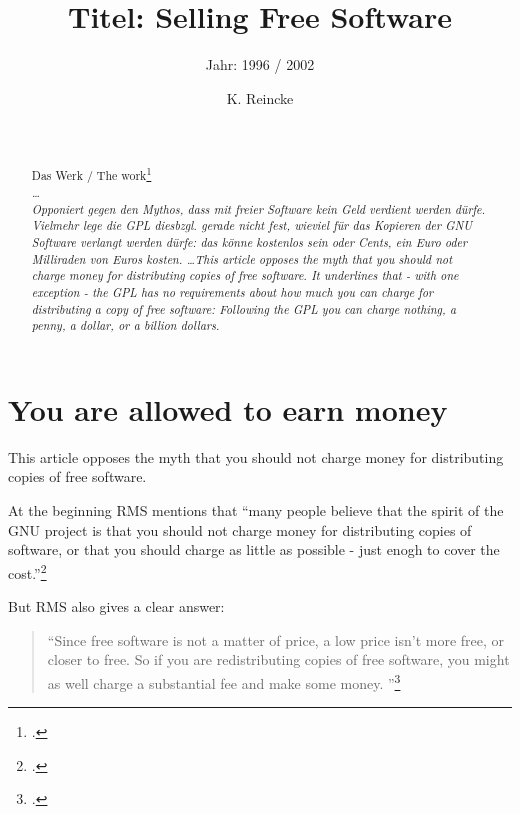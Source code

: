 \documentclass[DIV=calc,BCOR=5mm,11pt,headings=small,oneside,abstract=true, toc=bib]{scrartcl}
\begin{document}

\titlehead{Literaturexzerpt}
\subject{Autor(en): Stallman / Stallman1996b}
\title{Titel: Selling Free Software}
\subtitle{Jahr: 1996 / 2002 }
\author{K. Reincke}

\maketitle

\begin{abstract}
\noindent
\cite[(in:)][]{StaGay2002a} \\
\noindent
\cite[(ist:)][]{Stallman1996b} \\
Das Werk / The work\footcite[][]{Stallman1996b} \\
\noindent \itshape
\ldots  
\\ Opponiert gegen den Mythos, dass mit freier Software kein Geld verdient
werden dürfe. Vielmehr lege die GPL diesbzgl. gerade nicht fest, wieviel für das
Kopieren der GNU Software verlangt werden dürfe: das könne kostenlos sein oder
Cents, ein Euro oder Milliraden von Euros kosten.
\noindent
\ldots This article opposes the myth that you should not charge money for
distributing copies of free software. It underlines that - with one exception -
the GPL has no requirements about how much you can charge for distributing a
copy of free software: Following the GPL you can charge nothing, a penny, a
dollar, or a billion dollars.
\end{abstract}
\footnotesize
\normalsize

\section{You are allowed to earn money}
This article opposes the myth that you should not charge money for
distributing copies of free software. 

At the beginning RMS mentions that \enquote{many people believe that the
spirit of the GNU project is that you should not charge money for
distributing copies of software, or that you should charge as little as
possible - just enogh to cover the cost.}\footcite[cf][63]{Stallman1996b}

But RMS also gives a clear answer:

\begin{quote}
\enquote{Since free software is not a matter of price, a low price isn't more
free, or closer to free. So if you are redistributing copies of free software,
you might as well charge a substantial fee and make some money.
}\footcite[cf][63]{Stallman1996b}
\end{quote}
\end{document}
